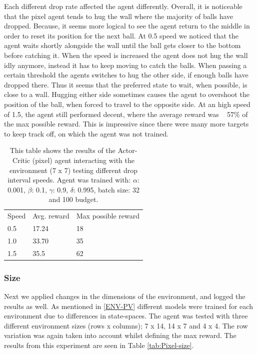 \documentclass{article}
\begin{document}
Each different drop rate affected the agent differently. 
Overall, it is noticeable that the pixel agent tends to hug the wall where the majority of balls have dropped.
Because, it seems more logical to see the agent return to the middle in order to reset its position for the next ball.
At 0.5 speed we noticed that the agent waits shortly alongside the wall until the ball gets closer to the bottom before catching it. 
When the speed is increased the agent does not hug the wall idly anymore, instead it has to keep moving to catch the balls. 
When passing a certain threshold the agents switches to hug the other side, if enough balls have dropped there. 
Thus it seems that the preferred state to wait, when possible, is close to a wall. 
Hugging either side sometimes causes the agent to overshoot the position of the ball, when forced to travel to the opposite side. 
At an high speed of 1.5, the agent still performed decent, where the average reward was ~ 57\% of the max possible reward. 
This is impressive since there were many more targets to keep track off, on which the agent was not trained. 

\begin{table}[]
\begin{tabular}{lll}
Speed & Avg. reward & Max possible reward \\
0.5   & 17.24       & 18                  \\
1.0   & 33.70       & 35                  \\
1.5   & 35.5        & 62                 
\end{tabular}
\caption{This table shows the results of the Actor-Critic (pixel) agent interacting with the environment (7 x 7) testing different drop interval speeds.  Agent was trained with: $\alpha$: 0.001, $\beta$: 0.1, $\gamma$: 0.9, $\delta$: 0.995, batch size: 32 and 100 budget. }
\label{tab:Pixel-speed}
\end{table}

\subsubsection{Size}
Next we applied changes in the dimensions of the environment, and logged the results as well.
As mentioned in \ref{ENV-PV} different models were trained for each environment due to differences in state-spaces. 
The agent was tested with three different environment sizes (rows x columns); 7 x 14, 14 x 7 and 4 x 4. 
The row variation was again taken into account whilst defining the max reward. 
The results from this experiment are seen in Table \ref{tab:Pixel-size}.
\end{document}
